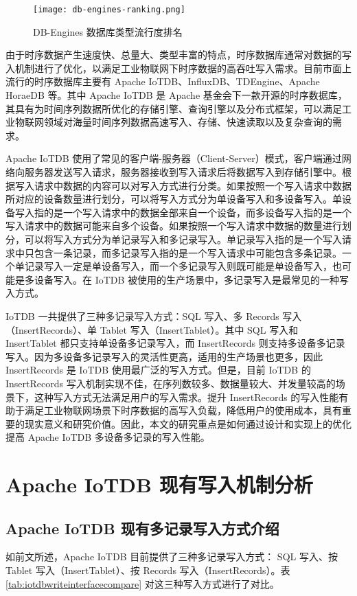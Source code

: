 \begin{figure}
  \centering
  \texttt{[image: db-engines-ranking.png]}
  \caption{DB-Engines 数据库类型流行度排名}
  \label{fig:db-engine}
\end{figure}

由于时序数据产生速度快、总量大、类型丰富的特点，时序数据库通常对数据的写入机制进行了优化，以满足工业物联网下时序数据的高吞吐写入需求。目前市面上流行的时序数据库主要有 Apache IoTDB\cite{wang2023apache}、InfluxDB\cite{naqvi2017time}、TDEngine\cite{tdengine2024github}、Apache HoraeDB\cite{apache2024horaedb} 等。其中 Apache IoTDB 是 Apache 基金会下一款开源的时序数据库，其具有为时间序列数据所优化的存储引擎、查询引擎以及分布式框架，可以满足工业物联网领域对海量时间序列数据高速写入、存储、快速读取以及复杂查询的需求\cite{wang2020apache}。

Apache IoTDB 使用了常见的客户端-服务器（Client-Server）模式，客户端通过网络向服务器发送写入请求，服务器接收到写入请求后将数据写入到存储引擎中。根据写入请求中数据的内容可以对写入方式进行分类。如果按照一个写入请求中数据所对应的设备数量进行划分，可以将写入方式分为单设备写入和多设备写入。单设备写入指的是一个写入请求中的数据全部来自一个设备，而多设备写入指的是一个写入请求中的数据可能来自多个设备。如果按照一个写入请求中数据的数量进行划分，可以将写入方式分为单记录写入和多记录写入。单记录写入指的是一个写入请求中只包含一条记录，而多记录写入指的是一个写入请求中可能包含多条记录。一个单记录写入一定是单设备写入，而一个多记录写入则既可能是单设备写入，也可能是多设备写入。在 IoTDB 被使用的生产场景中，多记录写入是最常见的一种写入方式。

IoTDB 一共提供了三种多记录写入方式：SQL 写入、多 Records 写入（InsertRecords）、单 Tablet 写入（InsertTablet）。其中 SQL 写入和 InsertTablet 都只支持单设备多记录写入，而 InsertRecords 则支持多设备多记录写入。因为多设备多记录写入的灵活性更高，适用的生产场景也更多，因此 InsertRecords 是 IoTDB 使用最广泛的写入方式。但是，目前 IoTDB 的 InsertRecords 写入机制实现不佳，在序列数较多、数据量较大、并发量较高的场景下，这种写入方式无法满足用户的写入需求。提升 InsertRecords 的写入性能有助于满足工业物联网场景下时序数据的高写入负载，降低用户的使用成本，具有重要的现实意义和研究价值。因此，本文的研究重点是如何通过设计和实现上的优化提高 Apache IoTDB 多设备多记录的写入性能。
\section{Apache IoTDB 现有写入机制分析\label{sec:chap1-sec2}}
\subsection{Apache IoTDB 现有多记录写入方式介绍}
如前文所述，Apache IoTDB 目前提供了三种多记录写入方式： SQL 写入、按 Tablet 写入（InsertTablet）、按 Records 写入（InsertRecords）。表 \ref{tab:iotdbwriteinterfacecompare} 对这三种写入方式进行了对比。

